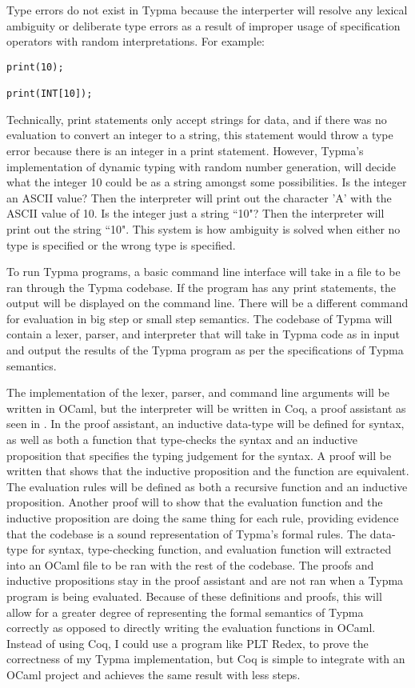 \documentclass[10pt,twocolumn]{article}
\begin{document}
Type errors do not exist in Typma because the interperter will resolve any lexical ambiguity or deliberate type errors as a result of improper usage of specification operators with random interpretations. For example:

\begin{lstlisting}
print(10);

print(INT[10]);
\end{lstlisting}

Technically, print statements only accept strings for data, and if there was no evaluation to convert an integer to a string, this statement would throw a type error because there is an integer in a print statement. However, Typma's implementation of dynamic typing with random number generation, will decide what the integer 10 could be as a string amongst some possibilities. Is the integer an ASCII value? Then the interpreter will print out the character 'A' with the ASCII value of 10. Is the integer just a string ``10"? Then the interpreter will print out the string ``10". This system is how ambiguity is solved when either no type is specified or the wrong type is specified.

To run Typma programs, a basic command line interface will take in a file to be ran through the Typma codebase. If the program has any print statements, the output will be displayed on the command line. There will be a different command for evaluation in big step or small step semantics. The codebase of Typma will contain a lexer, parser, and interpreter that will take in Typma code as in input and output the results of the Typma program as per the specifications of Typma semantics.

The implementation of the lexer, parser, and command line arguments will be written in OCaml, but the interpreter will be written in Coq, a proof assistant as seen in \textcite{Pierce2021Software}. In the proof assistant, an inductive data-type will be defined for syntax, as well as both a function that type-checks the syntax and an inductive proposition that specifies the typing judgement for the syntax. A proof will be written that shows that the inductive proposition and the function are equivalent. The evaluation rules will be defined as both a recursive function and an inductive proposition. Another proof will to show that the evaluation function and the inductive proposition are doing the same thing for each rule, providing evidence that the codebase is a sound representation of Typma's formal rules. The data-type for syntax, type-checking function, and evaluation function will extracted into an OCaml file to be ran with the rest of the codebase. The proofs and inductive propositions stay in the proof assistant and are not ran when a Typma program is being evaluated. Because of these definitions and proofs, this will allow for a greater degree of representing the formal semantics of Typma correctly as opposed to directly writing the evaluation functions in OCaml. Instead of using Coq, I could use a program like PLT Redex, to prove the correctness of my Typma implementation, but Coq is simple to integrate with an OCaml project and achieves the same result with less steps.
\end{document}
